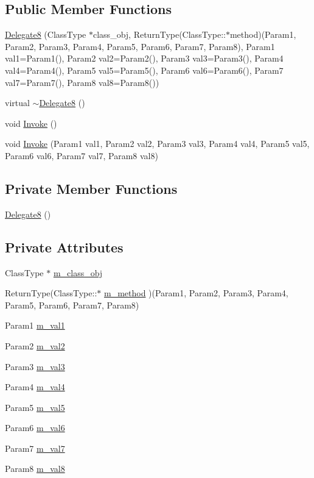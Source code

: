 \subsection*{Public Member Functions}
\begin{CompactItemize}
\item 
\hyperlink{classDL_1_1Delegate8_a0}{Delegate8} (Class\-Type $\ast$class\_\-obj, Return\-Type(Class\-Type::$\ast$method)(Param1, Param2, Param3, Param4, Param5, Param6, Param7, Param8), Param1 val1=Param1(), Param2 val2=Param2(), Param3 val3=Param3(), Param4 val4=Param4(), Param5 val5=Param5(), Param6 val6=Param6(), Param7 val7=Param7(), Param8 val8=Param8())
\item 
virtual \hyperlink{classDL_1_1Delegate8_a1}{$\sim$Delegate8} ()
\item 
void \hyperlink{classDL_1_1Delegate8_a2}{Invoke} ()
\item 
void \hyperlink{classDL_1_1Delegate8_a3}{Invoke} (Param1 val1, Param2 val2, Param3 val3, Param4 val4, Param5 val5, Param6 val6, Param7 val7, Param8 val8)
\end{CompactItemize}
\subsection*{Private Member Functions}
\begin{CompactItemize}
\item 
\hyperlink{classDL_1_1Delegate8_d0}{Delegate8} ()
\end{CompactItemize}
\subsection*{Private Attributes}
\begin{CompactItemize}
\item 
Class\-Type $\ast$ \hyperlink{classDL_1_1Delegate8_r0}{m\_\-class\_\-obj}
\item 
Return\-Type(Class\-Type::$\ast$ \hyperlink{classDL_1_1Delegate8_r1}{m\_\-method} )(Param1, Param2, Param3, Param4, Param5, Param6, Param7, Param8)
\item 
Param1 \hyperlink{classDL_1_1Delegate8_r2}{m\_\-val1}
\item 
Param2 \hyperlink{classDL_1_1Delegate8_r3}{m\_\-val2}
\item 
Param3 \hyperlink{classDL_1_1Delegate8_r4}{m\_\-val3}
\item 
Param4 \hyperlink{classDL_1_1Delegate8_r5}{m\_\-val4}
\item 
Param5 \hyperlink{classDL_1_1Delegate8_r6}{m\_\-val5}
\item 
Param6 \hyperlink{classDL_1_1Delegate8_r7}{m\_\-val6}
\item 
Param7 \hyperlink{classDL_1_1Delegate8_r8}{m\_\-val7}
\item 
Param8 \hyperlink{classDL_1_1Delegate8_r9}{m\_\-val8}
\end{CompactItemize}


